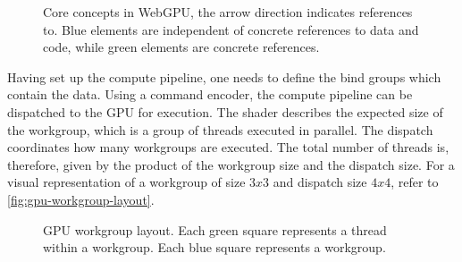 \begin{figure}[H]
  \centering
  \caption{Core concepts in \gls{WebGPU}, the arrow direction indicates references to. Blue elements are independent of concrete references to data and code, while green elements are concrete references.}
  \label{fig:webgpu-arch}
\end{figure}

Having set up the compute pipeline, one needs to define the bind groups which contain the data. Using a command encoder, the compute pipeline can be dispatched to the \gls{GPU} for execution. The shader describes the expected size of the workgroup, which is a group of threads executed in parallel. The dispatch coordinates how many workgroups are executed. The total number of threads is, therefore, given by the product of the workgroup size and the dispatch size. For a visual representation of a workgroup of size $3x3$ and dispatch size $4x4$, refer to \autoref{fig:gpu-workgroup-layout}.

\begin{figure}[H]
  \centering
  \caption{\gls{GPU} workgroup layout. Each green square represents a thread within a workgroup. Each blue square represents a workgroup.}
  \label{fig:gpu-workgroup-layout}
\end{figure}

